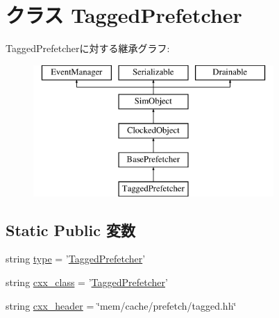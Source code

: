 \hypertarget{classPrefetcher_1_1TaggedPrefetcher}{
\section{クラス TaggedPrefetcher}
\label{classPrefetcher_1_1TaggedPrefetcher}
}
TaggedPrefetcherに対する継承グラフ:\begin{figure}[H]
\begin{center}
\leavevmode
\includegraphics[height=5cm]{classPrefetcher_1_1TaggedPrefetcher}
\end{center}
\end{figure}
\subsection*{Static Public 変数}
\begin{DoxyCompactItemize}
\item 
string \hyperlink{classPrefetcher_1_1TaggedPrefetcher_acce15679d830831b0bbe8ebc2a60b2ca}{type} = '\hyperlink{classPrefetcher_1_1TaggedPrefetcher}{TaggedPrefetcher}'
\item 
string \hyperlink{classPrefetcher_1_1TaggedPrefetcher_a58cd55cd4023648e138237cfc0822ae3}{cxx\_\-class} = '\hyperlink{classPrefetcher_1_1TaggedPrefetcher}{TaggedPrefetcher}'
\item 
string \hyperlink{classPrefetcher_1_1TaggedPrefetcher_a17da7064bc5c518791f0c891eff05fda}{cxx\_\-header} = \char`\"{}mem/cache/prefetch/tagged.hh\char`\"{}
\end{DoxyCompactItemize}


